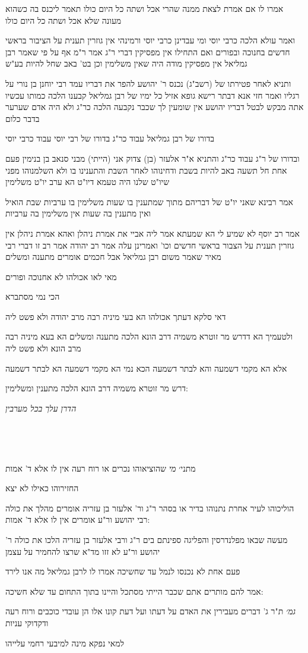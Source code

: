 \documentclass[12pt, openany]{book}
\newcommand{\sethebfont}{
\fontsize{10.5pt}{21.0pt} \selectfont
}
\newcommand{\textblock}[1]{
{\sethebfont #1\\}	
}
\begin{document}
\textblock{אמרו לו אם אמרת לצאת ממנה שהרי אכל ושתה כל היום כולו תאמר ליכנס בה כשהוא מעונה שלא אכל ושתה כל היום כולו}
\textblock{ואמר עולא הלכה כרבי יוסי ומי עבדינן כרבי יוסי ורמינהי אין גוזרין תענית על הציבור בראשי חדשים בחנוכה ובפורים ואם התחילו אין מפסיקין דברי ר"ג אמר ר"מ אף על פי שאמר רבן גמליאל אין מפסיקין מודה היה שאין משלימין וכן בט' באב שחל להיות בע"ש}
\textblock{ותניא לאחר פטירתו של (רשב"ג) נכנס ר' יהושע להפר את דבריו עמד רבי יוחנן בן נורי על רגליו ואמר חזי אנא דבתר רישא גופא אזיל כל ימיו של רבן גמליאל קבענו הלכה כמותו עכשיו אתה מבקש לבטל דבריו יהושע אין שומעין לך שכבר נקבעה הלכה כר"ג ולא היה אדם שערער בדבר כלום}
\textblock{בדורו של רבן גמליאל עבוד כר"ג בדורו של רבי יוסי עבוד כרבי יוסי}
\textblock{ובדורו של ר"ג עבוד כר"ג והתניא א"ר אלעזר (בן) צדוק אני (הייתי) מבני סנאב בן בנימין פעם אחת חל תשעה באב להיות בשבת ודחינוהו לאחר השבת והתענינו בו ולא השלמנוהו מפני שיו"ט שלנו היה טעמא דיו"ט הא ערב יו"ט משלימין}
\textblock{אמר רבינא שאני יו"ט של דבריהם מתוך שמתענין בו שעות משלימין בו ערביות שבת הואיל ואין מתענין בה שעות אין משלימין בה ערביות}
\textblock{אמר רב יוסף לא שמיע לי הא שמעתא אמר ליה אביי את אמרת ניהלן ואהא אמרת ניהלן אין גוזרין תענית על הצבור בראשי חדשים וכו' ואמרינן עלה אמר רב יהודה אמר רב זו דברי רבי מאיר שאמר משום רבן גמליאל אבל חכמים אומרים מתענה ומשלים}
\textblock{מאי לאו אכולהו לא אחנוכה ופורים}
\textblock{הכי נמי מסתברא}
\textblock{דאי סלקא דעתך אכולהו הא בעי מיניה רבה מרב יהודה ולא פשט ליה}
\textblock{ולטעמיך הא דדרש מר זוטרא משמיה דרב הונא הלכה מתענה ומשלים הא בעא מיניה רבה מרב הונא ולא פשט ליה}
\textblock{אלא הא מקמי דשמעה והא לבתר דשמעה הכא נמי הא מקמי דשמעה הא לבתר דשמעה}
\textblock{דרש מר זוטרא משמיה דרב הונא הלכה מתענין ומשלימין:}
\textblock{\par \par {\large\emph{הדרן עלך בכל מערבין}}\par \par }
\textblock{}
\textblock{מתני׳ {\large\emph{מי}} שהוציאוהו נכרים או רוח רעה אין לו אלא ד' אמות}
\textblock{החזירוהו כאילו לא יצא}
\textblock{הוליכוהו לעיר אחרת נתנוהו בדיר או בסהר ר"ג ור' אלעזר בן עזריה אומרים מהלך את כולה רבי יהושע ור"ע אומרים אין לו אלא ד' אמות:}
\textblock{מעשה שבאו מפלנדרסין והפליגה ספינתם בים ר"ג ורבי אלעזר בן עזריה הלכו את כולה ר' יהושע ור"ע לא זזו מד"א שרצו להחמיר על עצמן}
\textblock{פעם אחת לא נכנסו לנמל עד שחשיכה אמרו לו לרבן גמליאל מה אנו לירד}
\textblock{אמר להם מותרים אתם שכבר הייתי מסתכל והיינו בתוך התחום עד שלא חשיכה:}
\textblock{{\large\emph{גמ׳}} ת"ר ג' דברים מעבירין את האדם על דעתו ועל דעת קונו אלו הן עובדי כוכבים ורוח רעה ודקדוקי עניות}
\textblock{למאי נפקא מינה למיבעי רחמי עלייהו}
\end{document}
